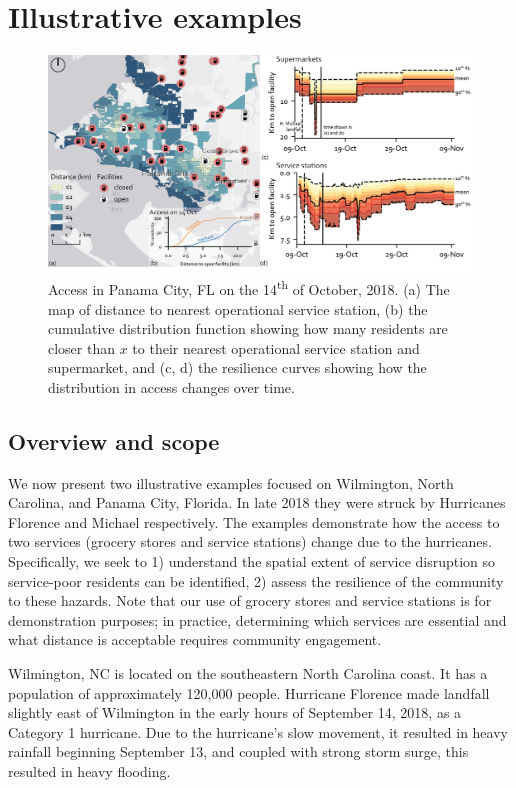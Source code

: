\documentclass[9pt,twocolumn,twoside,lineno]{pnas-new}
\begin{document}
\section*{Illustrative examples}
\begin{figure}
    \centering
    \includegraphics[width=0.8\linewidth]{report/fig/FL_resilience.png}
    \caption{Access in Panama City, FL on the 14\textsuperscript{th} of October, 2018. (a) The map of distance to nearest operational service station, (b) the cumulative distribution function showing how many residents are closer than $x$ to their nearest operational service station and supermarket, and (c, d) the resilience curves showing how the distribution in access changes over time.
    }
    \label{fig:resil_FL}
\end{figure}
\subsection*{Overview and scope}
We now present two illustrative examples focused on Wilmington, North Carolina, and Panama City, Florida.
In late 2018 they were struck by Hurricanes Florence and Michael respectively. 
The examples demonstrate how the access to two services (grocery stores and service stations) change due to the hurricanes. 
Specifically, we seek to 1) understand the spatial extent of service disruption so service-poor residents can be identified, 2) assess the resilience of the community to these hazards. 
Note that our use of grocery stores and service stations is for demonstration purposes; in practice, determining which services are essential and what distance is acceptable requires community engagement. 

Wilmington, NC is located on the southeastern North Carolina coast.
It has a population of approximately 120,000 people. 
Hurricane Florence made landfall slightly east of Wilmington in the early hours of September 14, 2018, as a Category 1 hurricane. 
Due to the hurricane’s slow movement, it resulted in heavy rainfall beginning September 13, and coupled with strong storm surge, this resulted in heavy flooding. 
\end{document}
